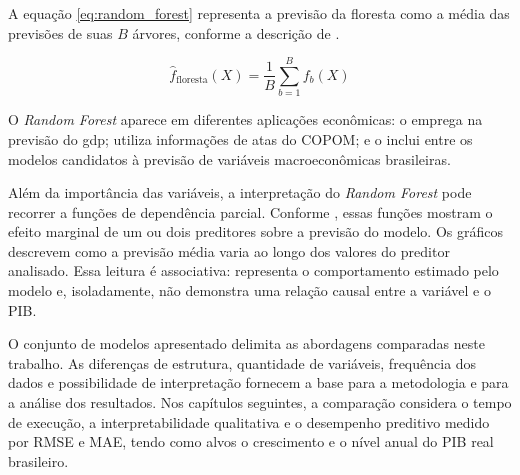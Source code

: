 A equação \ref{eq:random_forest} representa a previsão da floresta como a média das previsões de suas $B$ árvores, conforme a descrição de .

\begin{equation}
	\label{eq:random_forest}
	\hat f_{\mathrm{floresta}}(X) = \frac{1}{B}\sum_{b=1}^{B} f_b(X)
\end{equation}


O \textit{Random Forest} aparece em diferentes aplicações econômicas:  o emprega na previsão do \ac{gdp};  utiliza informações de atas do COPOM; e  o inclui entre os modelos candidatos à previsão de variáveis macroeconômicas brasileiras.

Além da importância das variáveis, a interpretação do \textit{Random Forest} pode recorrer a funções de dependência parcial. Conforme , essas funções mostram o efeito marginal de um ou dois preditores sobre a previsão do modelo. Os gráficos descrevem como a previsão média varia ao longo dos valores do preditor analisado. Essa leitura é associativa: representa o comportamento estimado pelo modelo e, isoladamente, não demonstra uma relação causal entre a variável e o PIB.

O conjunto de modelos apresentado delimita as abordagens comparadas neste trabalho. As diferenças de estrutura, quantidade de variáveis, frequência dos dados e possibilidade de interpretação fornecem a base para a metodologia e para a análise dos resultados. Nos capítulos seguintes, a comparação considera o tempo de execução, a interpretabilidade qualitativa e o desempenho preditivo medido por RMSE e MAE, tendo como alvos o crescimento e o nível anual do PIB real brasileiro.


%

